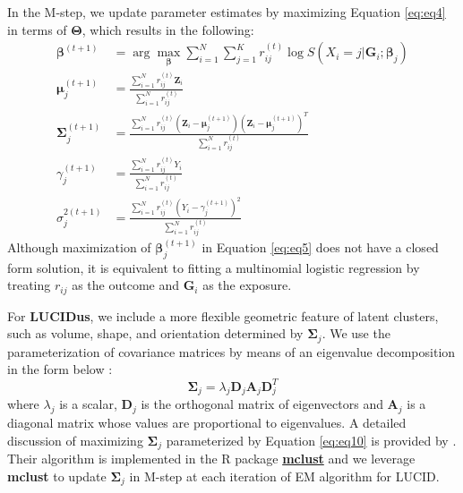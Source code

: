 In the M-step, we update parameter estimates by maximizing Equation
\eqref{eq:eq4} in terms of \(\boldsymbol{\mathbf{\Theta}}\), which results
in the following:
\[\begin{aligned}
    \boldsymbol{\mathbf{\beta}}^{(t+1)} & = \arg \max_{\boldsymbol{\mathbf{\beta}}} \sum_{i=1}^N \sum_{j=1}^K r_{ij}^{(t)} \log S(X_i = j| \boldsymbol{\mathbf{G}}_i; \boldsymbol{\mathbf{\beta}}_j) \label{eq5} \\
    \boldsymbol{\mathbf{\mu}}_j^{(t+1)} & = \frac{\sum_{i=1}^N r_{ij}^{(t)}\boldsymbol{\mathbf{Z}}_i}{\sum_{i=1}^N r_{ij}^{(t)}} \label{eq6} \\
    \boldsymbol{\mathbf{\Sigma}}_j^{(t+1)} & = \frac{\sum_{i=1}^N r_{ij}^{(t)} \left(\boldsymbol{\mathbf{Z}}_i - \boldsymbol{\mathbf{\mu}}_j^{(t+1)} \right) \left(\boldsymbol{\mathbf{Z}}_i - \boldsymbol{\mathbf{\mu}}_j^{(t+1)} \right)^T}{\sum_{i=1}^N r_{ij}^{(t)}} \label{eq7} \\
    \gamma_j^{(t+1)} & = \frac{\sum_{i=1}^N r_{ij}^{(t)}Y_i}{\sum_{i=1}^N r_{ij}^{(t)}} \label{eq8} \\
    \sigma_j^{2(t+1)} & = \frac{\sum_{i=1}^N r_{ij}^{(t)} \left(Y_i - \gamma_j^{(t+1)} \right)^2}{\sum_{i=1}^N r_{ij}^{(t)}} \label{eq9}
\end{aligned}   \label{eq:eq5}\]
Although maximization of \(\boldsymbol{\mathbf{\beta}}_j^{(t+1)}\) in
Equation \eqref{eq:eq5} does not have a closed form solution, it is
equivalent to fitting a multinomial logistic regression by treating
\(r_{ij}\) as the outcome and \(\boldsymbol{\mathbf{G}}_i\) as the exposure.

For \textbf{LUCIDus}, we include a more flexible geometric feature of latent
clusters, such as volume, shape, and orientation determined by
\(\boldsymbol{\mathbf{\Sigma}}_j\). We use the parameterization of
covariance matrices by means of an eigenvalue decomposition in the form
below \citep{banfield1993model}:
\[\boldsymbol{\mathbf{\Sigma}}_j = \lambda_j \boldsymbol{\mathbf{D}}_j \boldsymbol{\mathbf{A}}_j \boldsymbol{\mathbf{D}}_j^T \label{eq10}   \label{eq:eq10}\]
where \(\lambda_j\) is a scalar, \(\boldsymbol{\mathbf{D}}_j\) is the
orthogonal matrix of eigenvectors and \(\boldsymbol{\mathbf{A}}_j\) is a
diagonal matrix whose values are proportional to eigenvalues. A detailed
discussion of maximizing \(\boldsymbol{\mathbf{\Sigma}}_j\) parameterized
by Equation \eqref{eq:eq10} is provided by \citet{celeux1995gaussian}. Their
algorithm is implemented in the R package
\href{https://CRAN.R-project.org/package=mclust}{\textbf{mclust}}
\citep{scrucca2016mclust} and we leverage \textbf{mclust} to update
\(\boldsymbol{\mathbf{\Sigma}}_j\) in M-step at each iteration of EM
algorithm for LUCID.

